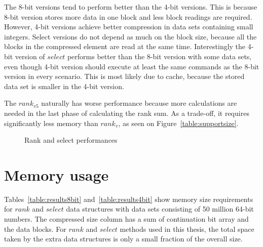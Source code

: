 The 8-bit versions tend to perform better than the 4-bit versions. This is because 8-bit version stores more data in one block and less block readings are required. However, 4-bit versions achieve 
better compression in data sets containing small integers. Select versions do not depend as much on the block size, because all the blocks in the compressed element are read at the same time. 
Interestingly the 4-bit version of $select$ performs better than the 8-bit version with some data sets, even though 4-bit version should execute at least the same commands as the 8-bit version 
in every scenario. This is most likely due to cache, because the stored data set is smaller in the 4-bit version.

The $rank_{v5}$ naturally has worse performance because more calculations are needed in the last phase of calculating the rank sum. As a trade-off, it requires 
significantly less memory than $rank_v$, as seen on Figure~\ref{table:supportsize}.

\begin{figure}[ht]
\centering
{}
\caption{Rank and select performances} \label{graph:data_comparison}
\end{figure}

\section{Memory usage}
Tables~\ref{table:results8bit} and~\ref{table:results4bit} show memory size requirements for $rank$ and $select$ data structures with data sets consisting
 of 50 million 64-bit numbers. The compressed size column has a sum of continuation bit array and the data blocks. For $rank$ and $select$ methods used in this thesis, the total 
space taken by the extra data structures is only a small fraction of the overall size.

